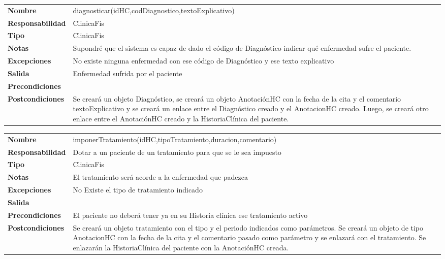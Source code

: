 \begin{table}[htbp]
	  \begin{tabularx}{\textwidth}{l|l}
    \textbf{Nombre}        & diagnosticar(idHC,codDiagnostico,textoExplicativo) \\ 
    \textbf{Responsabilidad}  & ClinicaFis \\ 
    \textbf{Tipo}        &  ClinicaFis\\ 
    \textbf{Notas}        &  Supondré que el sistema es capaz de dado el código de Diagnóstico indicar qué enfermedad sufre el paciente.\\ 
    \textbf{Excepciones}    & No existe ninguna enfermedad con ese código de Diagnóstico y ese texto explicativo \\ 
    \textbf{Salida}        & Enfermedad sufrida por el paciente  \\ 
    \textbf{Precondiciones}    &  \\ 
    \textbf{Postcondiciones}  & Se creará un objeto Diagnóstico, se creará un objeto AnotaciónHC con la fecha de la cita y el comentario textoExplicativo y se creará un enlace entre el Diagnóstico creado y el AnotacionHC creado. Luego, se creará otro enlace entre el AnotaciónHC creado y la HistoriaClínica del paciente. \\ 
  \end{tabularx}

\end{table}


\begin{table}[htbp]
	  \begin{tabularx}{\textwidth}{l|l}
    \textbf{Nombre}        & imponerTratamiento(idHC,tipoTratamiento,duracion,comentario) \\ 
    \textbf{Responsabilidad}  & Dotar a un paciente de un tratamiento para que se le sea impuesto  \\ 
    \textbf{Tipo}        & ClinicaFis \\ 
    \textbf{Notas}        &  El tratamiento será acorde a la enfermedad que padezca\\ 
    \textbf{Excepciones}    & No Existe el tipo de tratamiento indicado \\ 
    \textbf{Salida}        &  \\ 
    \textbf{Precondiciones}    & El paciente no deberá tener ya en su Historia clínica ese tratamiento activo \\ 
    \textbf{Postcondiciones}  &  Se creará un objeto tratamiento con el tipo y el periodo indicados como parámetros. Se creará un objeto de tipo AnotacionHC con la fecha de la cita y el comentario pasado como parámetro y se enlazará con el tratamiento. Se enlazarán la HistoriaClínica del paciente con la AnotaciónHC creada.\\ 
  \end{tabularx}

\end{table}




